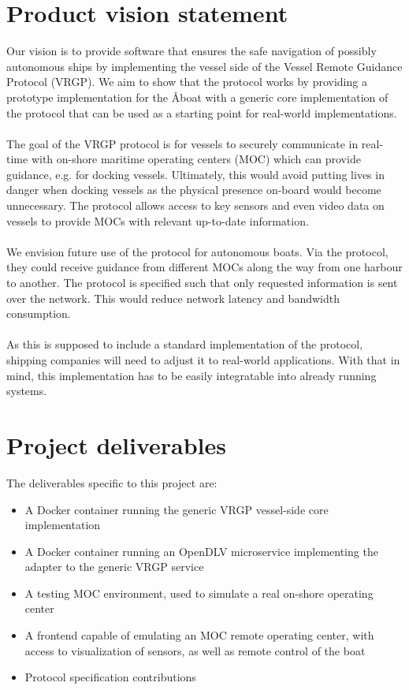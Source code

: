 \section{Product vision statement}\label{sec:vision}

Our vision is to provide software that ensures the safe navigation of possibly autonomous ships by implementing the vessel side of the Vessel Remote Guidance Protocol (VRGP). We aim to show that the protocol works by providing a prototype implementation for the Åboat with a generic core implementation of the protocol that can be used as a starting point for real-world implementations.
\\\\
The goal of the VRGP protocol is for vessels to securely communicate in real-time with on-shore maritime operating centers (MOC) which can provide guidance, e.g. for docking vessels. Ultimately, this would avoid putting lives in danger when docking vessels as the physical presence on-board would become unnecessary. The protocol allows access to key sensors and even video data on vessels to provide MOCs with relevant up-to-date information.
\\\\
We envision future use of the protocol for autonomous boats. Via the protocol, they could receive guidance from different MOCs along the way from one harbour to another. The protocol is specified such that only requested information is sent over the network. This would reduce network latency and bandwidth consumption.
\\\\
As this is supposed to include a standard implementation of the protocol, shipping companies will need to adjust it to real-world applications. With that in mind, this implementation has to be easily integratable into already running systems.

\section{Project deliverables}\label{sec:deliverables}

The deliverables specific to this project are:

\begin{itemize}
	\item A Docker container running the generic VRGP vessel-side core implementation
	\item A Docker container running an OpenDLV microservice implementing the adapter to the generic VRGP service
	\item A testing MOC environment, used to simulate a real on-shore operating center
	\item A frontend capable of emulating an MOC remote operating center, with access to visualization of sensors, as well as remote control of the boat
	\item Protocol specification contributions
\end{itemize}

